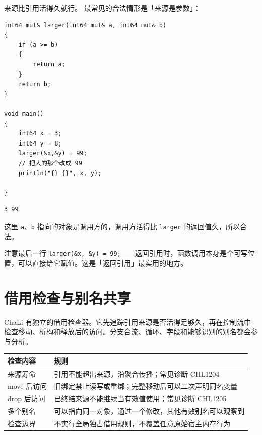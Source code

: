 来源比引用活得久就行。 最常见的合法情形是「来源是参数」：

\par
\medskip
\begin{lstlisting}[style=chali]
int64 mut& larger(int64 mut& a, int64 mut& b)
{
    if (a >= b)
    {
        return a;
    }
    return b;
}

void main()
{
    int64 x = 3;
    int64 y = 8;
    larger(&x,&y) = 99;
    // 把大的那个改成 99
    println("{} {}", x, y);

}
\end{lstlisting}
\par
\medskip

\par
\medskip
\begin{lstlisting}[style=out]
3 99
\end{lstlisting}
\par
\medskip

这里 \texttt{a}、\texttt{b} 指向的对象是调用方的，调用方活得比 \texttt{larger} 的返回值久，所以合法。

注意最后一行 \texttt{larger(\allowbreak{}\&x,\allowbreak{} \&y)\allowbreak{} =\allowbreak{} 99;}——返回引用时，函数调用本身是个可写位置，可以直接给它赋值。这是「返回引用」最实用的地方。

\section{借用检查与别名共享}

ChaLi 有独立的借用检查器。它先追踪引用来源是否活得足够久，再在控制流中检查移动、析构和释放后的访问。分支合流、循环、字段和能够识别的别名都会参与分析。

\begin{center}
\begin{tabular}{ll}
\toprule
检查内容 & 规则 \\
\midrule
来源寿命 & 引用不能超出来源，沿聚合传播；常见诊断 CHL1204 \\
move 后访问 & 旧绑定禁止读写或重绑；完整移动后可以二次声明同名变量 \\
drop 后访问 & 已终结来源不能继续当有效值使用；常见诊断 CHL1205 \\
多个别名 & 可以指向同一对象，通过一个修改，其他有效别名可以观察到 \\
检查边界 & 不实行全局独占借用规则，不覆盖任意原始宿主内存行为 \\
\bottomrule
\end{tabular}
\end{center}


